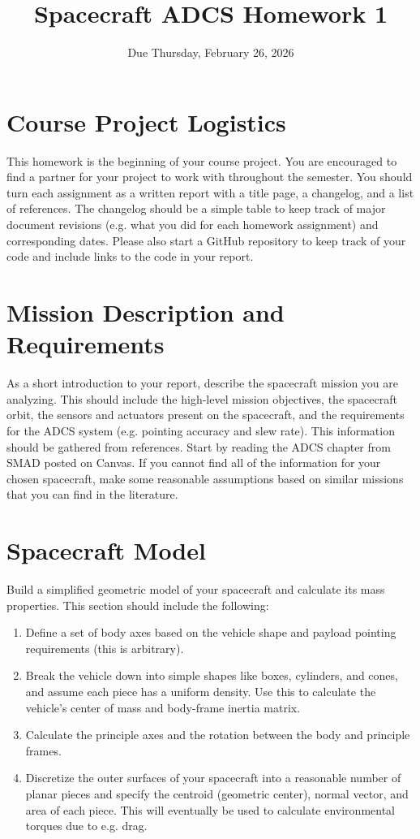 \documentclass[11pt,letterpaper]{article}
\title{Spacecraft ADCS Homework 1}
\author{Due Thursday, February 26, 2026}
\date{}
\begin{document}
\maketitle

\section{Course Project Logistics}

This homework is the beginning of your course project. You are encouraged to find a partner for your project to work with throughout the semester. You should turn each assignment as a written report with a title page, a changelog, and a list of references. The changelog should be a simple table to keep track of major document revisions (e.g. what you did for each homework assignment) and corresponding dates. Please also start a GitHub repository to keep track of your code and include links to the code in your report.

\section{Mission Description and Requirements}

As a short introduction to your report, describe the spacecraft mission you are analyzing. This should include the high-level mission objectives, the spacecraft orbit, the sensors and actuators present on the spacecraft, and the requirements for the ADCS system (e.g. pointing accuracy and slew rate). This information should be gathered from references. Start by reading the ADCS chapter from SMAD posted on Canvas. If you cannot find all of the information for your chosen spacecraft, make some reasonable assumptions based on similar missions that you can find in the literature.

\section{Spacecraft Model}

Build a simplified geometric model of your spacecraft and calculate its mass properties. This section should include the following:
\begin{enumerate}
	\item Define a set of body axes based on the vehicle shape and payload pointing requirements (this is arbitrary).
	\item Break the vehicle down into simple shapes like boxes, cylinders, and cones, and assume each piece has a uniform density. Use this to calculate the vehicle's center of mass and body-frame inertia matrix.
	\item Calculate the principle axes and the rotation between the body and principle frames.
	\item Discretize the outer surfaces of your spacecraft into a reasonable number of planar pieces and specify the centroid (geometric center), normal vector, and area of each piece. This will eventually be used to calculate environmental torques due to e.g. drag.
\end{enumerate}
\end{document}
